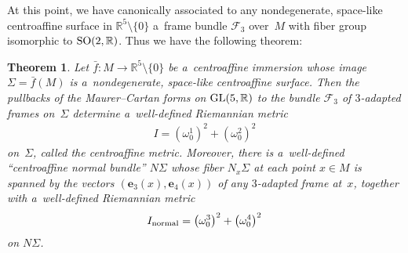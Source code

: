 \documentclass[10pt,a4paper]{amsart}
\numberwithin{equation}{section}
\newtheorem{teo}{Theorem}[section]
\theoremstyle{definition}
\begin{document}
At this point, we have canonically associated to any nondegenerate, space-like centroaf\/f\/ine surface in $\mathbb{R}^5
\setminus \{0\}$ a~frame bundle $\mathcal{F}_3$ over~$M$ with f\/iber group isomorphic to ${\rm SO}(2,\mathbb{R})$.
Thus we have the following theorem:

\begin{teo}
\label{space-like-thm}
Let $\bar{f}:M \to \mathbb{R}^5 \setminus\{0\}$ be a~centroaffine immersion whose image $\Sigma = \bar{f}(M)$ is
a~nondegenerate, space-like centroaffine surface.
Then the pullbacks of the Maurer--Cartan forms on ${\rm GL}(5,\mathbb{R})$ to the bundle $\mathcal{F}_3$ of $3$-adapted
frames on~$\Sigma$ determine a~well-defined Riemannian metric
\begin{gather*}
I = \left(\omega^1_0\right)^2 + \left(\omega^2_0\right)^2
\end{gather*}
on~$\Sigma$, called the centroaffine metric.
Moreover, there is a~well-defined ``centroaffine normal bundle'' $N\Sigma$ whose fiber $N_x\Sigma$ at each point $x \in
M$ is spanned by the vectors $(\mathbf{e}_3(x), \mathbf{e}_4(x))$ of any $3$-adapted frame at~$x$, together with
a~well-defined Riemannian metric
\begin{gather*}
I_{\rm normal} = \left(\omega^3_0\right)^2 + \left(\omega^4_0\right)^2
\end{gather*}
on $N\Sigma$.
\end{teo}
\end{document}
